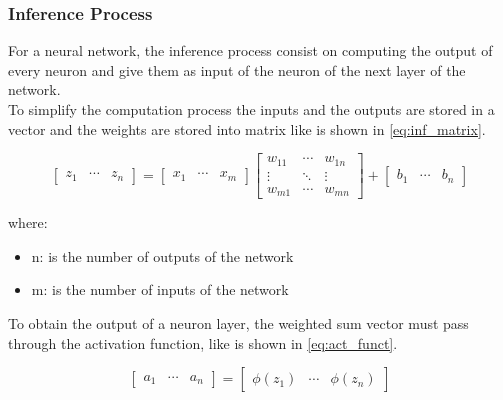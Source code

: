 \newpage
\subsubsection{Inference Process}

For a neural network, the inference process consist on computing the output of every neuron and give them as input of the neuron of the next layer of the network. \\
To simplify the computation process the inputs and the outputs are stored in a vector and the weights are stored into matrix like is shown in \cref{eq:inf_matrix}.

\begin{equation}
    \begin{bmatrix}
        z_1 & \cdots & z_n
    \end{bmatrix}
    = 
    \begin{bmatrix}
        x_1 & \cdots & x_m
    \end{bmatrix} 
    \begin{bmatrix}
        w_{11} & \cdots & w_{1n} \\
        \vdots & \ddots & \vdots \\
        w_{m1} & \cdots & w_{mn}
    \end{bmatrix}
    +
    \begin{bmatrix}
        b_1 & \cdots & b_n
    \end{bmatrix}
    \label{eq:inf_matrix}
\end{equation}

\noindent
where:

\begin{itemize}
    \setlength\itemsep{0pt}
    \setlength\parskip{0pt}
    \item n: is the number of outputs of the network
    \item m: is the number of inputs of the network
\end{itemize}

\noindent
To obtain the output of a neuron layer, the weighted sum vector must pass through the activation function, like is shown in \cref{eq:act_funct}.

\begin{equation}
    \begin{bmatrix}
        a_1 & \cdots & a_n
    \end{bmatrix}
    = 
    \begin{bmatrix}
        \phi(z_1) & \cdots & \phi(z_n)
    \end{bmatrix}
    \label{eq:act_funct}
\end{equation}

